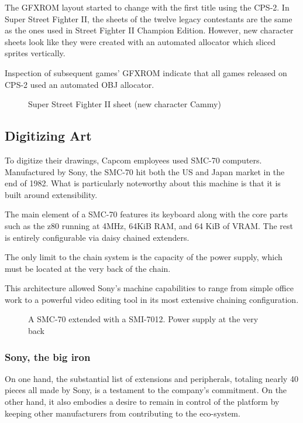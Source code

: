 The GFXROM layout started to change with the first title using the CPS-2. In Super Street Fighter II, the sheets of the twelve legacy contestants are the same as the ones used in Street Fighter II Champion Edition. However, new character sheets look like they were created with an automated allocator which sliced sprites vertically.

Inspection of subsequent games' GFXROM indicate that all games released on CPS-2 used an automated OBJ allocator.

 \begin{figure}[H]
\caption*{Super Street Fighter II sheet (new character Cammy)}
\end{figure}



\subsection{Digitizing Art}

To digitize their drawings, Capcom employees used SMC-70 computers. Manufactured by Sony, the SMC-70 hit both the US and Japan market in the end of 1982. What is particularly noteworthy about this machine is that it is built around extensibility. 

The main element of a SMC-70 features its keyboard along with the core parts such as the z80 running at 4MHz, 64KiB RAM, and 64 KiB of VRAM. The rest is entirely configurable via daisy chained extenders. 

The only limit to the chain system is the capacity of the power supply, which must be located at the very back of the chain. 


This architecture allowed Sony's machine capabilities to range from simple office work to a powerful video editing tool in its most extensive chaining configuration. 

\begin{figure}[H]
\caption*{A SMC-70 extended with a SMI-7012. Power supply at the very back}
\end{figure}

\subsubsection{Sony, the big iron}
On one hand, the substantial list of extensions and peripherals, totaling nearly 40 pieces all made by Sony, is a testament to the company's commitment. On the other hand, it also embodies a desire to remain in control of the platform by keeping other manufacturers from contributing to the eco-system.

